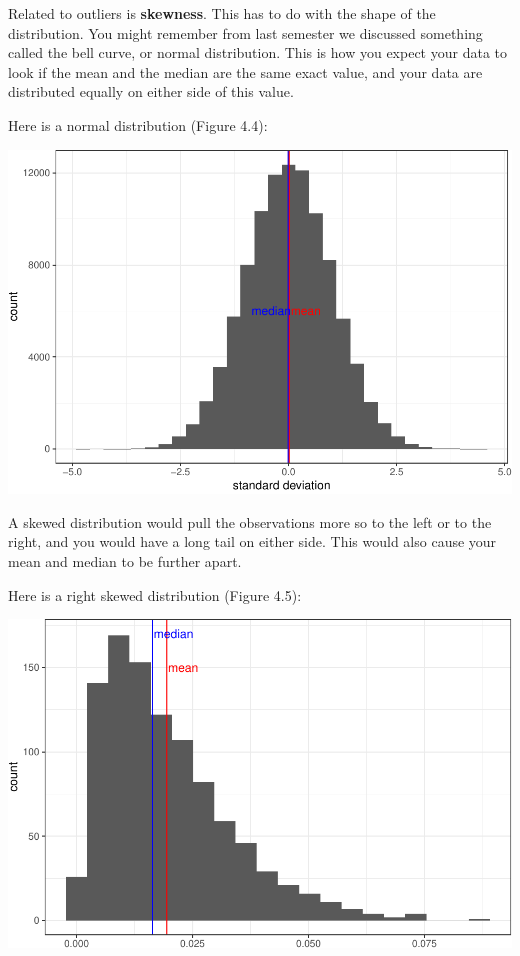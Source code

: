 \documentclass[
]{book}
\begin{document}
Related to outliers is \textbf{skewness}. This has to do with the shape of the distribution. You might remember from last semester we discussed something called the bell curve, or normal distribution. This is how you expect your data to look if the mean and the median are the same exact value, and your data are distributed equally on either side of this value.

Here is a normal distribution (Figure 4.4):

\includegraphics{04-descriptive-statistics_files/figure-latex/unnamed-chunk-42-1.pdf}

A skewed distribution would pull the observations more so to the left or to the right, and you would have a long tail on either side. This would also cause your mean and median to be further apart.

Here is a right skewed distribution (Figure 4.5):

\includegraphics{04-descriptive-statistics_files/figure-latex/unnamed-chunk-43-1.pdf}
\end{document}
